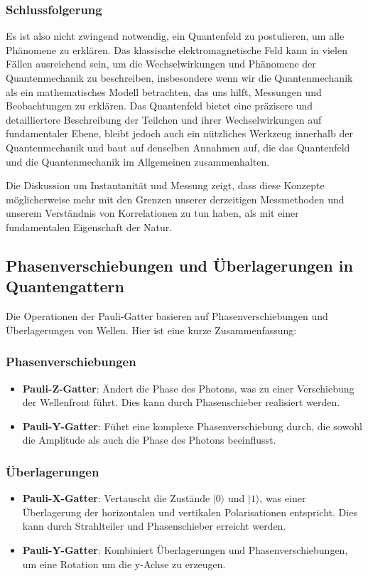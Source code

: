 \documentclass[12pt,a4paper]{article}
\begin{document}
	
	
	\subsubsection{Schlussfolgerung}
	Es ist also nicht zwingend notwendig, ein Quantenfeld zu postulieren, um alle Phänomene zu erklären. Das klassische elektromagnetische Feld kann in vielen Fällen ausreichend sein, um die Wechselwirkungen und Phänomene der Quantenmechanik zu beschreiben, insbesondere wenn wir die Quantenmechanik als ein mathematisches Modell betrachten, das uns hilft, Messungen und Beobachtungen zu erklären. Das Quantenfeld bietet eine präzisere und detailliertere Beschreibung der Teilchen und ihrer Wechselwirkungen auf fundamentaler Ebene, bleibt jedoch auch ein nützliches Werkzeug innerhalb der Quantenmechanik und baut auf denselben Annahmen auf, die das Quantenfeld und die Quantenmechanik im Allgemeinen zusammenhalten.
	
	Die Diskussion um Instantanität und Messung zeigt, dass diese Konzepte möglicherweise mehr mit den Grenzen unserer derzeitigen Messmethoden und unserem Verständnis von Korrelationen zu tun haben, als mit einer fundamentalen Eigenschaft der Natur.
	
	
	
	\subsection{Phasenverschiebungen und Überlagerungen in Quantengattern}
	
	Die Operationen der Pauli-Gatter basieren auf Phasenverschiebungen und Überlagerungen von Wellen. Hier ist eine kurze Zusammenfassung:
	
	\subsubsection{Phasenverschiebungen}
	\begin{itemize}
		\item \textbf{Pauli-Z-Gatter}: Ändert die Phase des Photons, was zu einer Verschiebung der Wellenfront führt. Dies kann durch Phasenschieber realisiert werden.
		\item \textbf{Pauli-Y-Gatter}: Führt eine komplexe Phasenverschiebung durch, die sowohl die Amplitude als auch die Phase des Photons beeinflusst.
	\end{itemize}
	
	\subsubsection{Überlagerungen}
	\begin{itemize}
		\item \textbf{Pauli-X-Gatter}: Vertauscht die Zustände \(|0\rangle\) und \(|1\rangle\), was einer Überlagerung der horizontalen und vertikalen Polarisationen entspricht. Dies kann durch Strahlteiler und Phasenschieber erreicht werden.
		\item \textbf{Pauli-Y-Gatter}: Kombiniert Überlagerungen und Phasenverschiebungen, um eine Rotation um die y-Achse zu erzeugen.
	\end{itemize}
	
\end{document}
